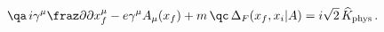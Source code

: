 \begin{equation}
\qa\, i\gamma^\mu\fraz \partial{\partial x^\mu_f} - e\gamma^\mu
 A_\mu(x_f)+m
\,\qc\,\Delta_F(x_f,x_i|A)=i{\sqrt{2}} \, {\widehat K}_{\rm phys}\,.
\end{equation}

